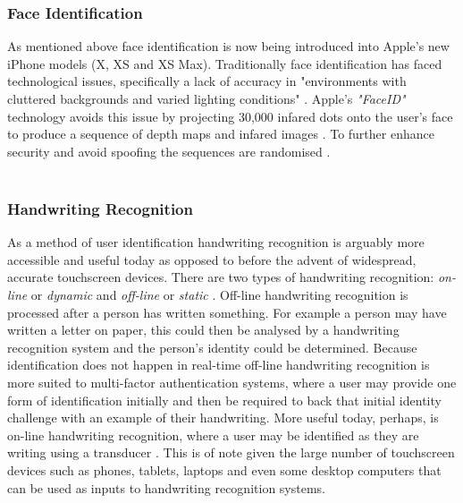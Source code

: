 \documentclass[12pt]{article}
\begin{document}
	\subsubsection{Face Identification}
	\label{subsubsect:face_identification}
	As mentioned above face identification is now being introduced into Apple's new iPhone models (X, XS and XS Max). Traditionally face identification has faced technological issues, specifically a lack of accuracy in "environments with cluttered backgrounds and varied lighting conditions" \citep{prabhakar2003biometric}. Apple's \emph{"FaceID"} technology avoids this issue by projecting 30,000 infared dots onto the user's face to produce a sequence of depth maps and infared images \citep{apple_faceid_2017}. To further enhance security and avoid spoofing the sequences are randomised \citep{apple_faceid_2017}.
	\\
	\\
	\subsubsection{Handwriting Recognition}
	\label{subsubsect:handwriting_recognition}
	As a method of user identification handwriting recognition is arguably more accessible and useful today as opposed to before the advent of widespread, accurate touchscreen devices. There are two types of handwriting recognition: \emph{on-line} or \emph{dynamic} and \emph{off-line} or \emph{static} \citep{tappert_handwriting}. Off-line handwriting recognition is processed after a person has written something. For example a person may have written a letter on paper, this could then be analysed by a handwriting recognition system and the person's identity could be determined. Because identification does not happen in real-time off-line handwriting recognition is more suited to multi-factor authentication systems, where a user may provide one form of identification initially and then be required to back that initial identity challenge with an example of their handwriting. More useful today, perhaps, is on-line handwriting recognition, where a user may be identified as they are writing using a transducer \citep{tappert_handwriting}. This is of note given the large number of touchscreen devices such as phones, tablets, laptops and even some desktop computers that can be used as inputs to handwriting recognition systems.
	\\
	\\
\end{document}
